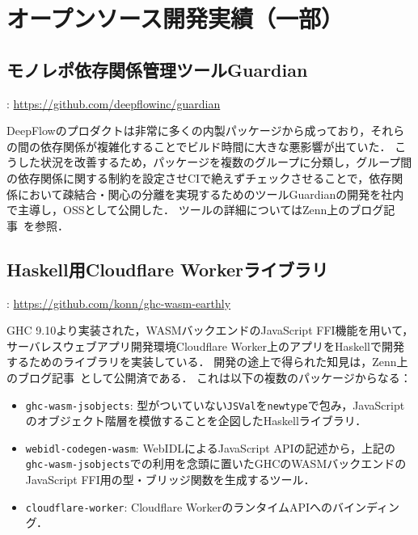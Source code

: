 \documentclass[a4j,draft]{ltjsarticle}
\renewcommand{\emph}[1]{\textbf{\textgt{#1}}}
\begin{document}
\section*{オープンソース開発実績（一部）}
\begin{refsection}
\newrefcontext[labelprefix={OSS-}] 

\subsection*{モノレポ依存関係管理ツールGuardian}
\vspace{-1em}
\noindent
\emph{URL}: \url{https://github.com/deepflowinc/guardian}
\vspace{1em}

DeepFlowのプロダクトは非常に多くの内製パッケージから成っており，それらの間の依存関係が複雑化することでビルド時間に大きな悪影響が出ていた．
こうした状況を改善するため，パッケージを複数のグループに分類し，グループ間の依存関係に関する制約を設定させCIで絶えずチェックさせることで，依存関係において疎結合・関心の分離を実現するためのツールGuardianの開発を社内で主導し，OSSとして公開した．
ツールの詳細についてはZenn上のブログ記事~\cite{ISHII:2023gd}を参照．

\subsection*{Haskell用Cloudflare Workerライブラリ}
\vspace{-1em}
\noindent
\emph{URL}: \url{https://github.com/konn/ghc-wasm-earthly}
\vspace{1em}

GHC 9.10より実装された，WASMバックエンドのJavaScript FFI機能を用いて，サーバレスウェブアプリ開発環境Cloudflare Worker上のアプリをHaskellで開発するためのライブラリを実装している．
開発の途上で得られた知見は，Zenn上のブログ記事~\cite{ISHII:2024cf}として公開済である．
これは以下の複数のパッケージからなる：

\begin{itemize}
  \item \texttt{ghc-wasm-jsobjects}: 型がついていない\verb|JSVal|を\verb|newtype|で包み，JavaScriptのオブジェクト階層を模倣することを企図したHaskellライブラリ．
  \item \texttt{webidl-codegen-wasm}: WebIDLによるJavaScript APIの記述から，上記の\texttt{ghc-wasm-jsobjects}での利用を念頭に置いたGHCのWASMバックエンドのJavaScript FFI用の型・ブリッジ関数を生成するツール．
  \item \texttt{cloudflare-worker}: Cloudflare WorkerのランタイムAPIへのバインディング．
\end{itemize}


\end{refsection}
\end{document}
